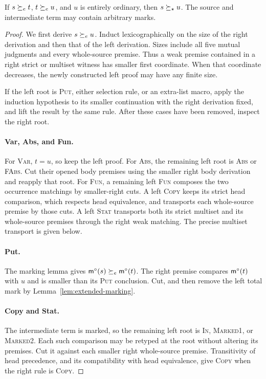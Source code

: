 \begin{theorem}\label{thm:cut}
If $s\succeq_e t$, $t\succeq_e u$, and $u$ is entirely ordinary,
then $s\succeq_\star u$. The source and intermediate term
may contain arbitrary marks.
\end{theorem}
\begin{proof}
We first derive $s\succeq_e u$. Induct lexicographically
on the size of the right derivation and then that
of the left derivation. Sizes include all five
mutual judgments and every whole-source premise.
Thus a weak premise contained in a right strict
or multiset witness has smaller first coordinate.
When that coordinate decreases, the newly
constructed left proof may have any finite size.

If the left root is \textsc{Put}, either selection
rule, or an extra-list macro, apply the induction
hypothesis to its smaller continuation with the
right derivation fixed, and lift the result by
the same rule. After these cases have been
removed, inspect the right root.

\paragraph{Var, Abs, and Fun.}
For \textsc{Var}, $t=u$, so keep the left proof.
For \textsc{Abs}, the remaining left root is
\textsc{Abs} or \textsc{FAbs}. Cut their opened
body premises using the smaller right body
derivation and reapply that root.
For \textsc{Fun}, a remaining left
\textsc{Fun} composes the two occurrence
matchings by smaller-right cuts. A left
\textsc{Copy} keeps its strict head comparison,
which respects head equivalence, and transports
each whole-source premise by those cuts.
A left \textsc{Stat} transports both its strict
multiset and its whole-source premises through
the right weak matching. The precise multiset
transport is given below.

\paragraph{Put.}
The marking lemma gives
$\mathsf m^\circ(s)\succeq_e \mathsf m^\circ(t)$.
The right premise compares $\mathsf m^\circ(t)$ with $u$
and is smaller than its \textsc{Put} conclusion.
Cut, and then remove the left total mark by
Lemma~\ref{lem:extended-marking}.

\paragraph{Copy and Stat.}
The intermediate term is marked, so the remaining
left root is \textsc{In}, \textsc{Marked1},
or \textsc{Marked2}. Each such comparison may
be retyped at the root without altering its
premises. Cut it against each smaller right
whole-source premise. Transitivity of head
precedence, and its compatibility with head
equivalence, give \textsc{Copy} when the right
rule is \textsc{Copy}.


\end{proof}
